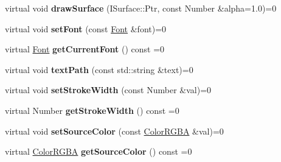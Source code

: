 \begin{DoxyCompactItemize}
\item 
\hypertarget{classsambag_1_1disco_1_1_i_draw_context_a26e9e04071f6dc357bbe2c9671ab12ad}{
virtual void {\bfseries drawSurface} (ISurface::Ptr, const Number \&alpha=1.0)=0}
\label{classsambag_1_1disco_1_1_i_draw_context_a26e9e04071f6dc357bbe2c9671ab12ad}

\item 
\hypertarget{classsambag_1_1disco_1_1_i_draw_context_a5f8aa0028936dc0313a6aa9578b27626}{
virtual void {\bfseries setFont} (const \hyperlink{structsambag_1_1disco_1_1_font}{Font} \&font)=0}
\label{classsambag_1_1disco_1_1_i_draw_context_a5f8aa0028936dc0313a6aa9578b27626}

\item 
\hypertarget{classsambag_1_1disco_1_1_i_draw_context_aa81698f5faa0d0b1487b260037cfc6a6}{
virtual \hyperlink{structsambag_1_1disco_1_1_font}{Font} {\bfseries getCurrentFont} () const =0}
\label{classsambag_1_1disco_1_1_i_draw_context_aa81698f5faa0d0b1487b260037cfc6a6}

\item 
\hypertarget{classsambag_1_1disco_1_1_i_draw_context_a875db8270b3a869a5c35735bd1c483e4}{
virtual void {\bfseries textPath} (const std::string \&text)=0}
\label{classsambag_1_1disco_1_1_i_draw_context_a875db8270b3a869a5c35735bd1c483e4}

\item 
\hypertarget{classsambag_1_1disco_1_1_i_draw_context_a1251bdb0ab496f3063176c97b01b4423}{
virtual void {\bfseries setStrokeWidth} (const Number \&val)=0}
\label{classsambag_1_1disco_1_1_i_draw_context_a1251bdb0ab496f3063176c97b01b4423}

\item 
\hypertarget{classsambag_1_1disco_1_1_i_draw_context_a260b3ea8d4e34577f47ac9d28d680a14}{
virtual Number {\bfseries getStrokeWidth} () const =0}
\label{classsambag_1_1disco_1_1_i_draw_context_a260b3ea8d4e34577f47ac9d28d680a14}

\item 
\hypertarget{classsambag_1_1disco_1_1_i_draw_context_aeed4d66d6a3a6b58ddfc516eae98e501}{
virtual void {\bfseries setSourceColor} (const \hyperlink{structsambag_1_1com_1_1_color_r_g_b_a}{ColorRGBA} \&val)=0}
\label{classsambag_1_1disco_1_1_i_draw_context_aeed4d66d6a3a6b58ddfc516eae98e501}

\item 
\hypertarget{classsambag_1_1disco_1_1_i_draw_context_a3a5752b558b912552e9b9841573c5867}{
virtual \hyperlink{structsambag_1_1com_1_1_color_r_g_b_a}{ColorRGBA} {\bfseries getSourceColor} () const =0}
\label{classsambag_1_1disco_1_1_i_draw_context_a3a5752b558b912552e9b9841573c5867}


\end{DoxyCompactItemize}

